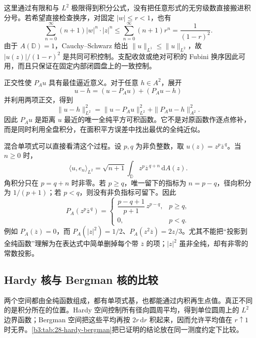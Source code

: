 这里通过有限和与 \(L^2\) 极限得到积分公式，没有把任意形式的无穷级数直接搬进积分号。若希望直接检查换序，对固定 \(|w|\le r<1\)，也有
\[
 \sum_{n=0}^{\infty}(n+1)|w|^n\cdot|z|^n
 \le\sum_{n=0}^{\infty}(n+1)r^n=\frac1{(1-r)^2}.
\]
由于 \(A(\mathbb D)=1\)，Cauchy--Schwarz 给出 \(\|u\|_{L^1}\le\|u\|_{L^2}\)，故 \(|u(z)|/(1-r)^2\) 是共同可积控制。支配收敛或绝对可积的 Fubini 换序因此可用，而且只保证在固定内部闭圆盘上的一致控制。

\ProseParagraphBreak

正交性使 \(P_Au\) 具有最佳逼近意义。对于任意 \(h\in A^2\)，展开
\[
 u-h=(u-P_Au)+(P_Au-h)
\]
并利用两项正交，得到
\[
 \|u-h\|_{L^2}^2
 =\|u-P_Au\|_{L^2}^2+\|P_Au-h\|_{A^2}^2.
\]
因此 \(P_Au\) 是距离 \(u\) 最近的唯一全纯平方可积函数。它不是对原函数作逐点修补，而是同时利用全盘积分，在面积平方误差中找出最优的全纯近似。

\ProseParagraphBreak

混合单项式可以直接看清这个过程。设 \(p,q\) 为非负整数，取 \(u(z)=z^p\overline z^{\,q}\)。当 \(n\ge0\) 时，
\[
 \langle u,e_n\rangle_{L^2}
 =\sqrt{n+1}\int_{\mathbb D}z^p\overline z^{\,q+n}\,\mathrm{d}A(z).
\]
角积分只在 \(p=q+n\) 时非零。若 \(p\ge q\)，唯一留下的指标为 \(n=p-q\)，径向积分为 \(1/(p+1)\)；若 \(p<q\)，则没有非负指标可留下。因此
\begin{equation}\label{b3:eq:28-projection-mixed-monomial}
 P_A(z^p\overline z^{\,q})
 =\begin{cases}
 \dfrac{p-q+1}{p+1}\,z^{p-q},&p\ge q,\\
 0,&p<q.
 \end{cases}
\end{equation}
例如 \(P_A(\overline z)=0\)，而 \(P_A(|z|^2)=1/2\)、\(P_A(z^2\overline z)=2z/3\)。尤其不能把“投影到全纯函数”理解为在表达式中简单删掉每个带 \(\overline z\) 的项；\(|z|^2\) 虽非全纯，却有非零的常数投影。

\subsection{Hardy 核与 Bergman 核的比较}
\label{b3:subsec:280504}

两个空间都由全纯函数组成，都有单项式基，也都能通过内积再生点值。真正不同的是积分所在的位置。Hardy 空间控制所有径向圆周平均，得到单位圆周上的 \(L^2\) 边界函数；Bergman 空间把这些平均再按 \(2r\,\mathrm{d}r\) 积起来，因而允许平均值在 \(r\uparrow1\) 时无界。\cref{b3:tab:28-hardy-bergman}把已证明的结论放在同一测度约定下比较。

